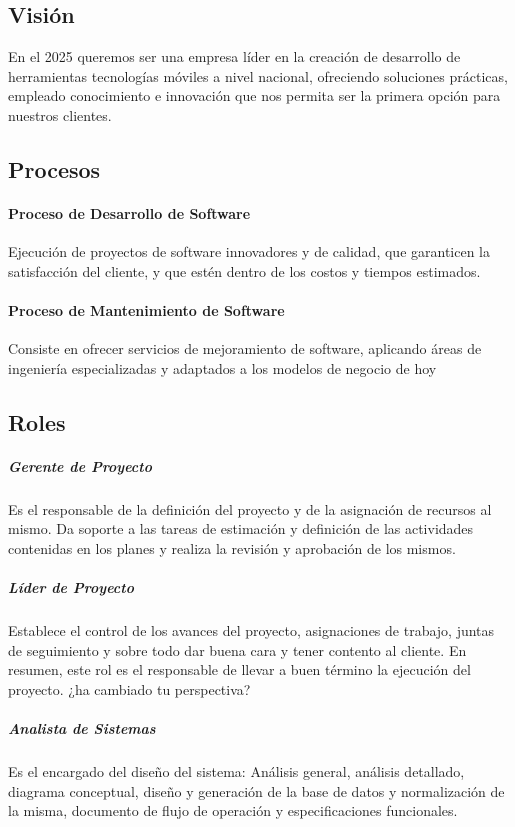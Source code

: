 \subsection{Visión}
En el 2025 queremos ser una empresa líder en la creación de desarrollo de herramientas tecnologías móviles a nivel nacional, ofreciendo soluciones prácticas, empleado conocimiento e innovación que nos permita ser la primera opción para nuestros clientes.

\subsection{Procesos}
\paragraph{Proceso de Desarrollo de Software}

Ejecución de proyectos de software innovadores y de calidad, que garanticen la satisfacción del cliente, y que estén dentro de los costos y tiempos estimados.
\paragraph{Proceso de Mantenimiento de Software}
Consiste en ofrecer servicios de mejoramiento de software, aplicando áreas de ingeniería especializadas y adaptados a los modelos de negocio de hoy
\subsection{Roles}
\subparagraph{Gerente de Proyecto}
Es el responsable de la definición del proyecto y de la asignación de recursos al mismo. Da soporte a las tareas de estimación y definición de las actividades contenidas en los planes y realiza la revisión y aprobación de los mismos.
\subparagraph{Líder de Proyecto}
Establece el control de los avances del proyecto, asignaciones de trabajo, juntas de seguimiento y sobre todo dar buena cara y tener contento al cliente. En resumen, este rol es el responsable de llevar a buen término la ejecución del proyecto. ¿ha cambiado tu perspectiva?
\subparagraph{Analista de Sistemas}
Es el encargado del diseño del sistema: Análisis general, análisis detallado, diagrama conceptual, diseño y generación de la base de datos y normalización de la misma, documento de flujo de operación y especificaciones funcionales.

